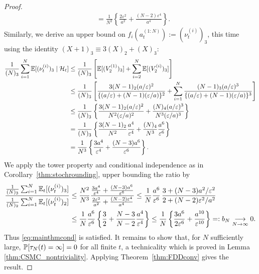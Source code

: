 \begin{proof}
\begin{align}
&= \frac{1}{N^2} \left\{\frac{2\varepsilon^2}{a^2} + \frac{(N-2)\varepsilon^4}{a^4}  \right\} . \label{eq:CSMC_cN_LB}
\end{align}
Similarly, we derive an upper bound on $f_i(a_t^{(1:N)}) := (\nu_t^{(i)})_3$, this time using the identity $(X+1)_3 \equiv 3(X)_2 +(X)_3 $:
\begin{align*}
\frac{1}{(N)_3} \sum_{i=1}^N \mathbb{E}[ (\nu_t^{(i)})_3 \mid \mathcal{H}_t]
&\leq \frac{1}{(N)_3} \left[ \mathbb{E}[ (V_2^{(1)})_3 ] + \sum_{i=2}^N \mathbb{E}[ (V_2^{(i)})_3 ] \right] \\
&\leq \frac{1}{(N)_3} \left[ \frac{ 3 (N-1)_2 (a/\varepsilon)^2}{\{(a/\varepsilon) + (N-1)(\varepsilon/a)\}^2} + \sum_{i=1}^N \frac{(N-1)_3 (a/\varepsilon)^3}{\{(a/\varepsilon) + (N-1)(\varepsilon/a)\}^3} \right] \\
&\leq \frac{1}{(N)_3} \left\{ \frac{3(N-1)_2 (a/\varepsilon)^2}{N^2 (\varepsilon/a)^2} + \frac{(N)_4 (a/\varepsilon)^3}{N^3 (\varepsilon/a)^3} \right\} \\
&= \frac{1}{(N)_3} \left\{ \frac{3(N-1)_2}{N^2} \frac{a^4}{\varepsilon^4} +\frac{(N)_4}{N^3} \frac{a^6}{\varepsilon^6} \right\} \\
&= \frac{1}{N^3} \left\{ \frac{3a^4}{\varepsilon^4} + \frac{(N-3) a^6}{\varepsilon^6} \right\} .
\end{align*}
We apply the tower property and conditional independence as in Corollary~\ref{thm:stochrounding}, upper bounding the ratio by
\begin{align*}
\frac{\frac{1}{(N)_3} \sum_{i=1}^N \mathbb{E}_t[ (\nu_t^{(i)})_3 ]}{\frac{1}{(N)_2} \sum_{i=1}^N \mathbb{E}_t[ (\nu_t^{(i)})_2 ]}
&\leq \frac{N^2}{N^3} \frac{ \frac{3a^4}{\varepsilon^4} + \frac{(N-3)a^6}{\varepsilon^6} }{ \frac{2\varepsilon^2}{a^2} + \frac{(N-2)\varepsilon^4}{a^4} }
\leq \frac{1}{N} \frac{a^6}{\varepsilon^6}\, \frac{3 + (N-3) a^2 / \varepsilon^2 }{2 + (N-2) \varepsilon^2 / a^2} \\
&\leq \frac{1}{N} \frac{a^6}{\varepsilon^6} \left\{ \frac{3}{2} + \frac{N-3}{N-2} \frac{a^4}{\varepsilon^4} \right\}
\leq \frac{1}{N} \left\{ \frac{3 a^6}{2 \varepsilon^6} + \frac{a^{10}}{\varepsilon^{10}} \right\}
=: b_N \underset{N\to\infty}{\longrightarrow} 0.
\end{align*}
Thus \eqref{eq:mainthmcond} is satisfied. It remains to show that, for $N$ sufficiently large, $\mathbb{P}[ \tau_N(t) = \infty ] =0$ for all finite $t$, a technicality which is proved in Lemma \ref{thm:CSMC_nontriviality}. Applying Theorem~\ref{thm:FDDconv} gives the result.
\end{proof}


